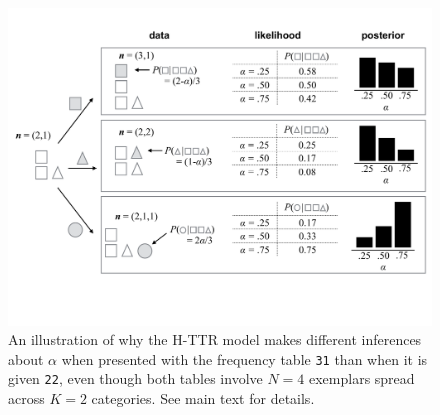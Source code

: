 \documentclass[doc]{apa6}
\newcommand{\dist}[1]{\texttt{#1}}
\begin{document}
\begin{figure}[p]
\begin{center}
\includegraphics[scale=.4]{httr_inference.pdf}
\caption{An illustration of why the H-TTR model makes different inferences about $\alpha$ when presented with the frequency table \dist{31} than when it is given \dist{22}, even though both tables involve $N=4$ exemplars spread across $K=2$ categories. See main text for details. }
\label{fig:httr}
\end{center}
\end{figure}
\end{document}

